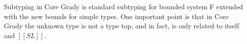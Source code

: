 Subtyping in Core Grady is standard subtyping for bounded system F
extended with the new bounds for simple types.  One important point is
that in Core Grady the unknown type is not a type top, and in fact, is
only related to itself and $[[SL]]$.  



